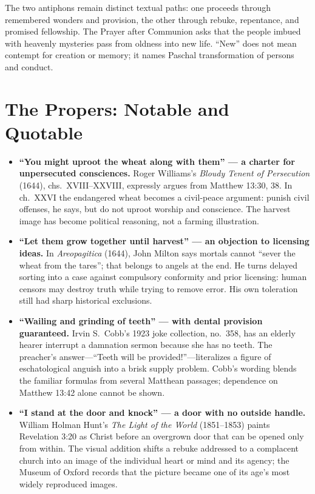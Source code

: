 The two antiphons remain distinct textual paths: one proceeds through remembered wonders and provision, the other through rebuke, repentance, and promised fellowship. The Prayer after Communion asks that the people imbued with heavenly mysteries pass from oldness into new life. “New” does not mean contempt for creation or memory; it names Paschal transformation of persons and conduct.

\section*{The Propers: Notable and Quotable}

{\small
\begin{itemize}
\item \textbf{“You might uproot the wheat along with them” --- a charter for unpersecuted consciences.\enspace{}} Roger Williams's \emph{Bloudy Tenent of Persecution} (1644), chs.~XVIII--XXVIII, expressly argues from Matthew 13:30, 38. In ch.~XXVI the endangered wheat becomes a civil-peace argument: punish civil offenses, he says, but do not uproot worship and conscience. The harvest image has become political reasoning, not a farming illustration.

\item \textbf{“Let them grow together until harvest” --- an objection to licensing ideas.\enspace{}} In \emph{Areopagitica} (1644), John Milton says mortals cannot “sever the wheat from the tares”; that belongs to angels at the end. He turns delayed sorting into a case against compulsory conformity and prior licensing: human censors may destroy truth while trying to remove error. His own toleration still had sharp historical exclusions.

\item \textbf{“Wailing and grinding of teeth” --- with dental provision guaranteed.\enspace{}} Irvin S.~Cobb's 1923 joke collection, no.~358, has an elderly hearer interrupt a damnation sermon because she has no teeth. The preacher's answer---“Teeth will be provided!”---literalizes a figure of eschatological anguish into a brisk supply problem. Cobb's wording blends the familiar formulas from several Matthean passages; dependence on Matthew 13:42 alone cannot be shown.

\item \textbf{“I stand at the door and knock” --- a door with no outside handle.\enspace{}} William Holman Hunt's \emph{The Light of the World} (1851--1853) paints Revelation 3:20 as Christ before an overgrown door that can be opened only from within. The visual addition shifts a rebuke addressed to a complacent church into an image of the individual heart or mind and its agency; the Museum of Oxford records that the picture became one of its age's most widely reproduced images.

\end{itemize}
}

